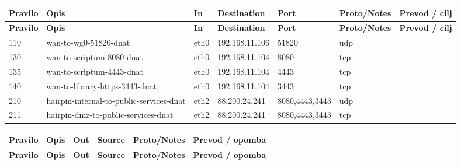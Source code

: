 
\begin{longtable}{|l|l|l|l|p{2.2cm}|l|l|}
\hline
\textbf{Pravilo} & \textbf{Opis} & \textbf{In} & \textbf{Destination} & \textbf{Port} & \textbf{Proto/Notes} & \textbf{Prevod / cilj} \\
\hline
\endfirsthead
\hline
\textbf{Pravilo} & \textbf{Opis} & \textbf{In} & \textbf{Destination} & \textbf{Port} & \textbf{Proto/Notes} & \textbf{Prevod / cilj} \\
\hline
\endhead
110 & wan-to-wg0-51820-dnat & eth0 & 192.168.11.106 & 51820 & udp &  \\
130 & wan-to-scriptum-8080-dnat & eth0 & 192.168.11.104 & 8080 & tcp &  \\
135 & wan-to-scriptum-4443-dnat & eth0 & 192.168.11.104 & 4443 & tcp &  \\
140 & wan-to-library-https-3443-dnat & eth0 & 192.168.11.104 & 3443 & tcp &  \\
210 & hairpin-internal-to-public-services-dnat & eth2 & 88.200.24.241 & 8080,4443,3443 & udp &  \\
211 & hairpin-dmz-to-public-services-dnat & eth2 & 88.200.24.241 & 8080,4443,3443 & tcp &  \\
\hline
\end{longtable}


\begin{longtable}{|l|l|l|l|l|l|}
\hline
\textbf{Pravilo} & \textbf{Opis} & \textbf{Out} & \textbf{Source} & \textbf{Proto/Notes} & \textbf{Prevod / opomba} \\
\hline
\endfirsthead
\hline
\textbf{Pravilo} & \textbf{Opis} & \textbf{Out} & \textbf{Source} & \textbf{Proto/Notes} & \textbf{Prevod / opomba} \\
\hline
\endhead
\hline
\end{longtable}


